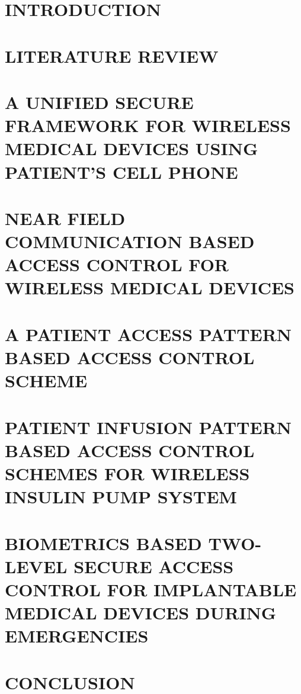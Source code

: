 \documentclass[reqno,12pt,oneside]{report} %
\theoremstyle{plain}
\theoremstyle{definition}
\theoremstyle{remark}
\numberwithin{theorem}{chapter}
\begin{document}
\chapter{INTRODUCTION}
 \label{chap:Particles}
 

\chapter{LITERATURE REVIEW}
 \label{chap:Particles}
 

\chapter{A UNIFIED SECURE FRAMEWORK FOR WIRELESS MEDICAL DEVICES USING PATIENT'S CELL PHONE}
 \label{chap:Particles}
 

\chapter{NEAR FIELD COMMUNICATION BASED ACCESS CONTROL FOR WIRELESS MEDICAL DEVICES}
 \label{chap:Particles}
 

\chapter{A PATIENT ACCESS PATTERN BASED ACCESS CONTROL SCHEME}
 \label{chap:Particles}
 

\chapter{PATIENT INFUSION PATTERN BASED ACCESS CONTROL SCHEMES FOR WIRELESS INSULIN PUMP SYSTEM}
 \label{chap:Particles}
 

\chapter{BIOMETRICS BASED TWO-LEVEL SECURE ACCESS CONTROL FOR IMPLANTABLE MEDICAL DEVICES DURING EMERGENCIES}
 \label{chap:Particles}
 

\chapter{CONCLUSION}
 \label{chap:Particles}
 


\startbibliography
 \begin{singlespace} %
  
  
 \end{singlespace}

 \startappendices
 \label{Carelink USB Driver Decoding}
 
\end{document}
